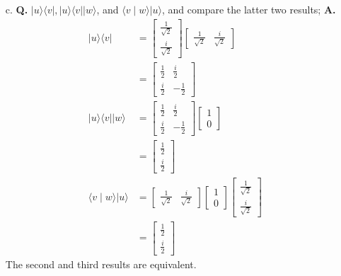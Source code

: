 \documentclass[main.tex]{subfiles}
\begin{document}
\begin{enumerate}
\begin{enumerate}
        \item[c.] \textbf{Q.} $|u\rangle\langle v|,| u\rangle\langle v|| w\rangle$, and $\langle v \mid w\rangle|u\rangle$, and compare the latter two results; \textbf{A.}
        \begin{align*}
            |u\rangle\langle v|             & = \left[\begin{array}{r} \frac{1}{\sqrt{2}} \\ \frac{i}{\sqrt{2}} \end{array}\right] \left[\begin{array}{ll} \frac{1}{\sqrt{2}} & \frac{i}{\sqrt{2}} \end{array}\right]\\ 
                                            & = \left[\begin{array}{cc} \frac{1}{2} & \frac{i}{2} \\ \frac{i}{2} & -\frac{1}{2} \end{array}\right]\\
            |u\rangle\langle v|| w\rangle   & = \left[\begin{array}{cc} \frac{1}{2} & \frac{i}{2} \\ \frac{i}{2} & -\frac{1}{2} \end{array}\right] \left[\begin{array}{r} 1 \\ 0 \end{array}\right]\\
                                            & = \left[\begin{array}{r} \frac{1}{2} \\ \frac{i}{2} \end{array}\right]\\
            \langle v\mid w\rangle|u\rangle & = \left[\begin{array}{ll} \frac{1}{\sqrt{2}} & \frac{i}{\sqrt{2}} \end{array}\right] 
                                                \left[\begin{array}{r} 1 \\ 0 \end{array}\right] 
                                                \left[\begin{array}{r} \frac{1}{\sqrt{2}} \\ \frac{i}{\sqrt{2}} \end{array}\right]\\
                                            & = \left[\begin{array}{r} \frac{1}{2} \\ \frac{i}{2} \end{array}\right]
        \end{align*}
        The second and third results are equivalent.
        

\end{enumerate}
\end{enumerate}
\end{document}
